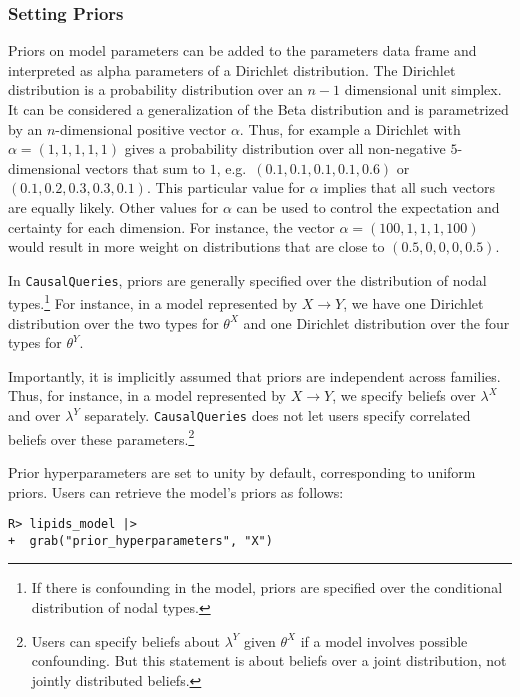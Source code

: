 \documentclass[
  11pt,
  article]{jss}
\begin{document}
\hypertarget{priors}{%
\subsubsection{Setting Priors}\label{priors}}

Priors on model parameters can be added to the parameters data frame and
interpreted as alpha parameters of a Dirichlet distribution. The
Dirichlet distribution is a probability distribution over an \(n-1\)
dimensional unit simplex. It can be considered a generalization of the
Beta distribution and is parametrized by an \(n\)-dimensional positive
vector \(\alpha\). Thus, for example a Dirichlet with
\(\alpha = (1, 1, 1, 1, 1)\) gives a probability distribution over all
non-negative \(5\)-dimensional vectors that sum to \(1\),
e.g.~\((0.1, 0.1, 0.1, 0.1, 0.6)\) or \((0.1, 0.2, 0.3, 0.3, 0.1)\).
This particular value for \(\alpha\) implies that all such vectors are
equally likely. Other values for \(\alpha\) can be used to control the
expectation and certainty for each dimension. For instance, the vector
\(\alpha = (100, 1, 1, 1, 100)\) would result in more weight on
distributions that are close to \((0.5, 0, 0, 0, 0.5)\).

In \texttt{CausalQueries}, priors are generally specified over the
distribution of nodal types.\footnote{If there is confounding in the
  model, priors are specified over the conditional distribution of nodal
  types.} For instance, in a model represented by \(X \rightarrow Y\),
we have one Dirichlet distribution over the two types for \(\theta^X\)
and one Dirichlet distribution over the four types for \(\theta^Y\).

Importantly, it is implicitly assumed that priors are independent across
families. Thus, for instance, in a model represented by
\(X \rightarrow Y\), we specify beliefs over \(\lambda^X\) and over
\(\lambda^Y\) separately. \texttt{CausalQueries} does not let users
specify correlated beliefs over these parameters.\footnote{Users can
  specify beliefs about \(\lambda^Y\) given \(\theta^X\) if a model
  involves possible confounding. But this statement is about beliefs
  over a joint distribution, not jointly distributed beliefs.}

Prior hyperparameters are set to unity by default, corresponding to
uniform priors. Users can retrieve the model's priors as follows:

\begin{verbatim}
R> lipids_model |> 
+  grab("prior_hyperparameters", "X") 
\end{verbatim}
\end{document}
